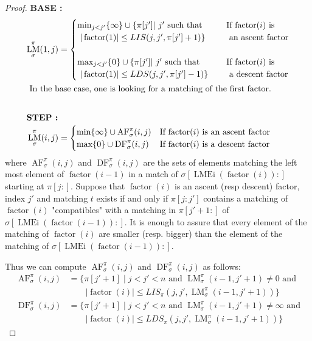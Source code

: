 \documentclass[a4paper]{llncs}
\newcommand{\ptext}{\pi}
\newcommand{\ppattern}{\sigma}
\DeclareMathOperator{\LMEi}{LMEi}
\DeclareMathOperator{\factor}{factor}
\DeclareMathOperator{\LMa}{LM}
\newcommand{\LM}[4]{\LMa_{{#1}}^{{#2}}(#3,#4)}
\DeclareMathOperator{\AFa}{AF}
\newcommand{\AF}[4]{\AFa_{{#1}}^{{#2}}(#3,#4)}
\DeclareMathOperator{\DFa}{DF}
\newcommand{\DF}[4]{\DFa_{{#1}}^{{#2}}(#3,#4)}
\begin{document}
\begin{proof}
\noindent\textbf{BASE :}
\begin{align*}
\LM{\ppattern}{\ptext}{1}{j} 
&=
\begin{cases}
		\min_{j<j'}\{\infty\} \cup \{\ptext[j'] |\text{ $j'$ such that \indent } 
			& \text{If $\factor(i)$ is}  \\
		\text{ $|\factor(1)| \leq LIS(j,j',\ptext[j']+1)  $}\}
			&\text{ an ascent factor} \\
		&\\
		\max_{j<j'}\{0\} \cup \{\ptext[j'] |\text{ $j'$ such that \indent } 
			& \text{If $\factor(i)$ is}  \\
		\text{ $|\factor(1)| \leq LDS(j,j',\ptext[j']-1) $}\}
			&\text{ a descent factor}\\
\end{cases}
\\
\intertext{
In the base case,
one is looking for a matching of the first factor.
}
\\
\intertext{\textbf{STEP :}}
\LM{\ppattern}{\ptext}{i}{j} 
&=
\begin{cases}
	\min \{\infty\} \cup  \AF{\ppattern}{\ptext}{i}{j} &
	\text{If $\factor(i)$ is an ascent factor}\\
	\max \{0\} \cup  \DF{\ppattern}{\ptext}{i}{j} &
	\text{If $\factor(i)$ is a descent factor}\\
\end{cases}
\end{align*}
where $\AF{\ppattern}{\ptext}{i}{j}$ and $\DF{\ppattern}{\ptext}{i}{j}$ are the sets 
of elements matching the left most element of $\factor(i-1)$ in a match of $\sigma[\LMEi(\factor(i)):]$ starting at $\ptext[j:]$.
Suppose that $\factor(i)$ is an ascent (resp descent) factor, index $j'$ and matching $t$ exists if and only if
$\ptext[j:j']$ contains a matching of $\factor(i)$ "compatibles" with a matching in $\ptext[j'+1:]$ of $\sigma[\LMEi(\factor(i-1)):]$. It is enough to assure that every element of the matching of $\factor(i)$ are smaller (resp. bigger) than the element of the matching of $\sigma[\LMEi(\factor(i-1)):]$. 

Thus we can compute $\AF{\ppattern}{\ptext}{i}{j}$ and $\DF{\ppattern}{\ptext}{i}{j}$ as follows:
\begin{align*}
\AF{\ppattern}{\ptext}{i}{j}
&=
\text{$\{\ptext[j'+1] \;|\; j<j'<n$ and $\LM{\ppattern}{\ptext}{i-1}{j'+1} \neq 0$ and} 
\\
&\qquad 
\text{$|\factor(i)| \leq LIS_{\ptext}(j,j',\LM{\ppattern}{\ptext}{i-1}{j'+1})\}$} 
\\
\DF{\ppattern}{\ptext}{i}{j}
&=
\text{$\{\ptext[j'+1] \;|\; j<j'<n$ and $\LM{\ppattern}{\ptext}{i-1}{j'+1} \neq \infty$ and}
\\
&\qquad
\text{$|\factor(i)| \leq LDS_{\ptext}(j,j',\LM{\ppattern}{\ptext}{i-1}{j'+1})\}$}
\end{align*}


\end{proof}
\end{document}
